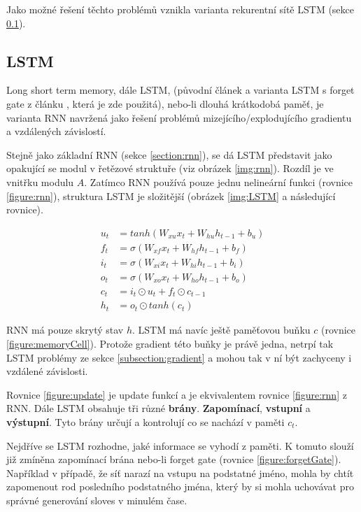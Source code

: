 Jako možné řešení těchto problémů vznikla varianta rekurentní sítě LSTM (sekce \ref{section:LSTM}).


\subsection{LSTM}\label{section:LSTM}
Long short term memory, dále LSTM, (původní článek \cite{LSTM} a varianta LSTM s forget gate z článku \cite{forgetLSTM}, která je zde použitá), nebo-li dlouhá krátkodobá paměť, je varianta RNN navržená jako řešení problémů mizejícího/explodujícího gradientu a vzdálených závislostí.

Stejně jako základní RNN (sekce \ref{section:rnn}), se dá LSTM představit jako opakující se modul v řetězové struktuře (viz obrázek \ref{img:rnn}). Rozdíl je ve vnitřku modulu $A$. Zatímco RNN používá pouze jednu nelineární funkci (rovnice \ref{figure:rnn}), struktura LSTM je složitější (obrázek \ref{img:LSTM} a následující rovnice).

\begin{align}
    u_{t}&=tanh(W_{xu}x_t + W_{hu}h_{t-1} + b_u) \label{figure:update} \\
    f_{t}&=\sigma(W_{xf}x_{t}+W_{hf}h_{t-1}+b_{f}) \label{figure:forgetGate} \\
    i_{t}&=\sigma(W_{xi}x_{t}+W_{hi}h_{t-1}+b_{i}) \label{figure:inputGate} \\
    o_{t}&=\sigma(W_{xo}x_{t}+W_{ho}h_{t-1}+b_{o}) \label{figure:outputGate} \\
    c_{t}&=i_{t}\odot u_{t}+f_{t}\odot c_{t-1}\label{figure:memoryCell} \\
    h_{t}&=o_{t}\odot tanh(c_{t}) \label{figure:hiddenState}
\end{align}

RNN má pouze skrytý stav $h$. LSTM má navíc ještě paměťovou buňku $c$ (rovnice \ref{figure:memoryCell}). Protože gradient této buňky je právě jedna, netrpí tak LSTM problémy ze sekce \ref{subsection:gradient} a mohou tak v ní být zachyceny i vzdálené závislosti.

Rovnice \ref{figure:update} je update funkcí a je ekvivalentem rovnice \ref{figure:rnn} z RNN.
Dále LSTM obsahuje tři různé \textbf{brány}. \textbf{Zapomínací}, \textbf{vstupní} a \textbf{výstupní}. Tyto brány určují a kontrolují co se nachází v paměti $c_t$.

Nejdříve se LSTM rozhodne, jaké informace se vyhodí z paměti. K tomuto slouží již zmíněna zapomínací brána nebo-li forget gate (rovnice \ref{figure:forgetGate}). Například v případě, že síť narazí na vstupu na podstatné jméno, mohla by chtít zapomenout rod posledního podstatného jména, který by si mohla uchovávat pro správné generování sloves v minulém čase.

